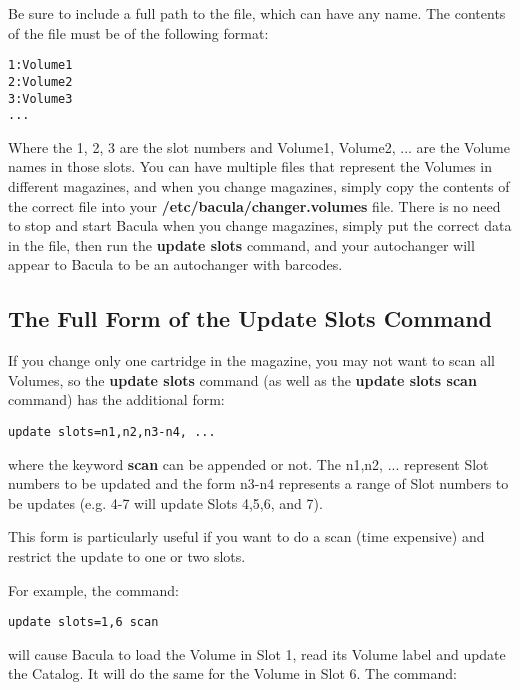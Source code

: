 Be sure to include a full path to the file, which can have any name. The
contents of the file must be of the following format: 

\footnotesize
\begin{verbatim}
1:Volume1
2:Volume2
3:Volume3
...
\end{verbatim}
\normalsize

Where the 1, 2, 3 are the slot numbers and Volume1, Volume2, ... are the
Volume names in those slots. You can have multiple files that represent the
Volumes in different magazines, and when you change magazines, simply copy the
contents of the correct file into your {\bf /etc/bacula/changer.volumes} file.
There is no need to stop and start Bacula when you change magazines, simply
put the correct data in the file, then run the {\bf update slots} command, and
your autochanger will appear to Bacula to be an autochanger with barcodes. 
\label{updateslots}

\subsection*{The Full Form of the Update Slots Command}

If you change only one cartridge in the magazine, you may not want to scan all
Volumes, so the {\bf update slots} command (as well as the {\bf update slots
scan} command) has the additional form: 

\footnotesize
\begin{verbatim}
update slots=n1,n2,n3-n4, ...
\end{verbatim}
\normalsize

where the keyword {\bf scan} can be appended or not. The n1,n2, ... represent
Slot numbers to be updated and the form n3-n4 represents a range of Slot
numbers to be updates (e.g. 4-7 will update Slots 4,5,6, and 7). 

This form is particularly useful if you want to do a scan (time expensive) and
restrict the update to one or two slots. 

For example, the command: 

\footnotesize
\begin{verbatim}
update slots=1,6 scan
\end{verbatim}
\normalsize

will cause Bacula to load the Volume in Slot 1, read its Volume label and
update the Catalog. It will do the same for the Volume in Slot 6. The command:


